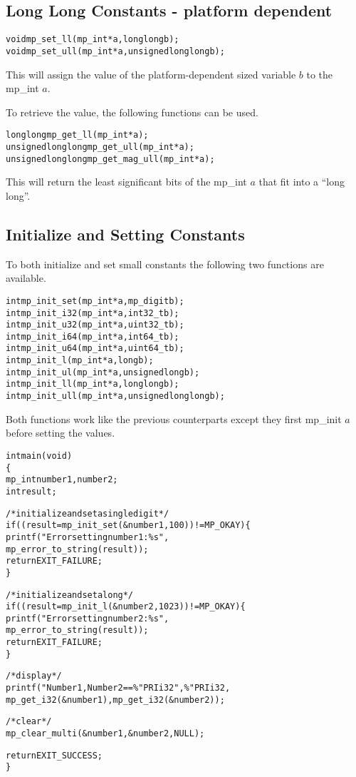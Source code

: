 \documentclass[synpaper]{book}
\begin{document}
\subsection{Long Long Constants - platform dependent}

 
\begin{alltt}
void mp_set_ll (mp_int * a, long long b);
void mp_set_ull (mp_int * a, unsigned long long b);
\end{alltt}

This will assign the value of the platform-dependent sized variable $b$ to the mp\_int $a$.

To retrieve the value, the following functions can be used.

\begin{alltt}
long long mp_get_ll (mp_int * a);
unsigned long long mp_get_ull (mp_int * a);
unsigned long long mp_get_mag_ull (mp_int * a);
\end{alltt}

This will return the least significant bits of the mp\_int $a$ that fit into a ``long long''.

\subsection{Initialize and Setting Constants}
To both initialize and set small constants the following two functions are available.
 
\begin{alltt}
int mp_init_set (mp_int * a, mp_digit b);
int mp_init_i32 (mp_int * a, int32_t b);
int mp_init_u32 (mp_int * a, uint32_t b);
int mp_init_i64 (mp_int * a, int64_t b);
int mp_init_u64 (mp_int * a, uint64_t b);
int mp_init_l   (mp_int * a, long b);
int mp_init_ul  (mp_int * a, unsigned long b);
int mp_init_ll  (mp_int * a, long long b);
int mp_init_ull (mp_int * a, unsigned long long b);
\end{alltt}

Both functions work like the previous counterparts except they first mp\_init $a$ before setting the values.

\begin{alltt}
int main(void)
\{
   mp_int number1, number2;
   int    result;

   /* initialize and set a single digit */
   if ((result = mp_init_set(&number1, 100)) != MP_OKAY) \{
      printf("Error setting number1: \%s",
             mp_error_to_string(result));
      return EXIT_FAILURE;
   \}

   /* initialize and set a long */
   if ((result = mp_init_l(&number2, 1023)) != MP_OKAY) \{
      printf("Error setting number2: \%s",
             mp_error_to_string(result));
      return EXIT_FAILURE;
   \}

   /* display */
   printf("Number1, Number2 == \%" PRIi32 ", \%" PRIi32,
          mp_get_i32(&number1), mp_get_i32(&number2));

   /* clear */
   mp_clear_multi(&number1, &number2, NULL);

   return EXIT_SUCCESS;
\}
\end{alltt}
\end{document}
